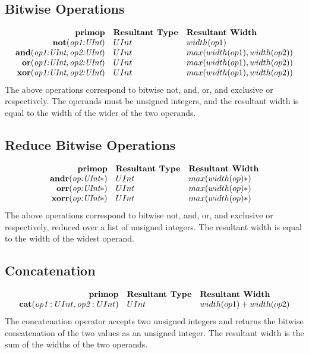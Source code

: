 \documentclass[10pt]{article}
\begin{document}
\subsection{Bitwise Operations}
\[
\begin{array}{rll}
\text{\bf primop} & \text{\bf Resultant Type} & \text{\bf Resultant Width} \\
\text{\bf not}     (\text{\em op1:UInt}) & UInt & width(op1)    \\
\text{\bf and}     (\text{\em op1:UInt}, \text{\em op2:UInt}) & UInt & max(width(op1),width(op2))    \\
\text{\bf or}      (\text{\em op1:UInt}, \text{\em op2:UInt}) & UInt & max(width(op1),width(op2))    \\
\text{\bf xor}     (\text{\em op1:UInt}, \text{\em op2:UInt}) & UInt & max(width(op1),width(op2))    \\
\end{array}
\]
The above operations correspond to bitwise not, and, or, and exclusive or respectively.
The operands must be unsigned integers, and the resultant width is equal to the width of the wider of the two operands. 

\subsection{Reduce Bitwise Operations}
\[
\begin{array}{rll}
\text{\bf primop} & \text{\bf Resultant Type} & \text{\bf Resultant Width} \\
\text{\bf andr}     (\text{\em op:UInt}*) & UInt & max(width(op)*)    \\
\text{\bf orr}      (\text{\em op:UInt}*) & UInt & max(width(op)*)    \\
\text{\bf xorr}     (\text{\em op:UInt}*) & UInt & max(width(op)*)    \\
\end{array}
\]
The above operations correspond to bitwise not, and, or, and exclusive or respectively, reduced over a list of unsigned integers.
The resultant width is equal to the width of the widest operand.

\subsection{Concatenation}
\[
\begin{array}{rll}
\text{\bf primop} & \text{\bf Resultant Type} & \text{\bf Resultant Width} \\
\text{\bf cat}(\text{\em op1}:UInt, \text{\em op2}:UInt)  & UInt & width(op1) + width(op2)    \\
\end{array}
\]
The concatenation operator accepts two unsigned integers and returns the bitwise concatenation of the two values as an unsigned integer.
The resultant width is the sum of the widths of the two operands.
\end{document}
